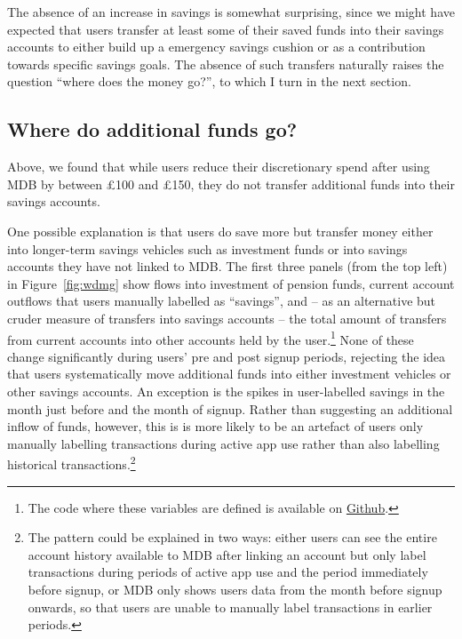 The absence of an increase in savings is somewhat surprising, since we might
have expected that users transfer at least some of their saved funds into their
savings accounts to either build up a emergency savings cushion or as a
contribution towards specific savings goals.  The absence of such transfers
naturally raises the question ``where does the money go?'', to which I turn in
the next section.


\subsection{Where do additional funds go?}%
\label{sub:where_do_additional_funds_go_}

Above, we found that while users reduce their discretionary spend after using
MDB by between \pounds100 and \pounds150, they do not transfer additional funds
into their savings accounts.

One possible explanation is that users do save more but transfer money either
into longer-term savings vehicles such as investment funds or into savings
accounts they have not linked to MDB. The first three panels (from the top
left) in Figure~\ref{fig:wdmg} show flows into investment of pension funds,
current account outflows that users manually labelled as ``savings'', and -- as
an alternative but cruder measure of transfers into savings accounts -- the
total amount of transfers from current accounts into other accounts held by the
user.\footnote{The code where these variables are defined is available on
\href{https://github.com/fabiangunzinger/mdb_eval/blob/f31bfcd7a330188cdd27968d41957ebf5b454099/src/data/aggregators.py\#L300}{Github}.}
None of these change significantly during users' pre and post signup periods,
rejecting the idea that users systematically move additional funds into either
investment vehicles or other savings accounts. An exception is the spikes in
user-labelled savings in the month just before and the month of signup. Rather
than suggesting an additional inflow of funds, however, this is is more likely
to be an artefact of users only manually labelling transactions during active
app use rather than also labelling historical transactions.\footnote{The pattern
    could be explained in two ways: either users can see the entire account
    history available to MDB after linking an account but only label
    transactions during periods of active app use and the period immediately
before signup, or MDB only shows users data from the month before signup
onwards, so that users are unable to manually label transactions in earlier
periods.}

